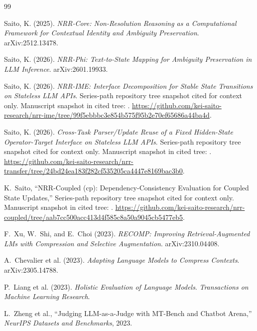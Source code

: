\documentclass[11pt,a4paper]{article}
\begin{document}
\begin{thebibliography}{99}\sloppy

Saito, K. (2025).
\textit{NRR-Core: Non-Resolution Reasoning as a Computational Framework for Contextual Identity and Ambiguity Preservation}.
arXiv:2512.13478.

Saito, K. (2026).
\textit{NRR-Phi: Text-to-State Mapping for Ambiguity Preservation in LLM Inference}.
arXiv:2601.19933.

Saito, K. (2026).
\textit{NRR-IME: Interface Decomposition for Stable State Transitions on Stateless LLM APIs}.
Series-path repository tree snapshot cited for context only. Manuscript snapshot in cited tree: . \url{https://github.com/kei-saito-research/nrr-ime/tree/99f5ebbbc3e854b575f95b2e70ef65686a44ba4d}.

Saito, K. (2026).
\textit{Cross-Task Parser/Update Reuse of a Fixed Hidden-State Operator-Target Interface on Stateless LLM APIs}.
Series-path repository tree snapshot cited for context only. Manuscript snapshot in cited tree: . \url{https://github.com/kei-saito-research/nrr-transfer/tree/24bd24ea183f282cf535205ca4447e8169bac3b0}.

K.~Saito,
\newblock ``NRR-Coupled (cp): Dependency-Consistency Evaluation for Coupled State Updates,''
\newblock Series-path repository tree snapshot cited for context only. Manuscript snapshot in cited tree:
.
\url{https://github.com/kei-saito-research/nrr-coupled/tree/aab7cc500acc413d4f585c8a50a9045cb5477eb5}.

F.~Xu, W.~Shi, and E.~Choi (2023).
\textit{RECOMP: Improving Retrieval-Augmented LMs with Compression and Selective Augmentation}.
arXiv:2310.04408.

A.~Chevalier et al. (2023).
\textit{Adapting Language Models to Compress Contexts}.
arXiv:2305.14788.

P.~Liang et al. (2023). \textit{Holistic Evaluation of Language Models}.
\emph{Transactions on Machine Learning Research}.

L.~Zheng et al.,
\newblock ``Judging LLM-as-a-Judge with MT-Bench and Chatbot Arena,''
\newblock \emph{NeurIPS Datasets and Benchmarks}, 2023.


\end{thebibliography}
\end{document}

